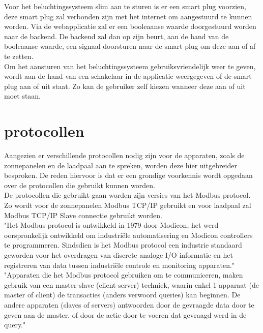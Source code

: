 Voor het beluchtingssysteem slim aan te sturen is er een smart plug voorzien, deze smart plug zal verbonden zijn met het internet om aangestuurd te kunnen worden. Via de webapplicatie zal er een booleaanse waarde doorgestuurd worden naar de backend. De backend zal dan op zijn beurt, aan de hand van de booleaanse waarde, een signaal doorsturen naar de smart plug om deze aan of af te zetten.\\

Om het aansturen van het beluchtingssysteem gebruiksvriendelijk weer te geven, wordt aan de hand van een schakelaar in de applicatie weergegeven of de smart plug aan of uit staat. Zo kan de gebruiker zelf kiezen wanneer deze aan of uit moet staan.

\section{protocollen}
\label{sec:stand-van-zaken-protocollen}

Aangezien er verschillende protocollen nodig zijn voor de apparaten, zoals de zonnepanelen en de laadpaal aan te spreken, worden deze hier uitgebreider besproken. De reden hiervoor is dat er een grondige voorkennis wordt opgedaan over de protocollen die gebruikt kunnen worden.\\

De protocollen die gebruikt gaan worden zijn versies van het Modbus protocol. Zo wordt voor de zonnepanelen Modbus TCP/IP gebruikt en voor laadpaal zal Modbus TCP/IP Slave connectie gebruikt worden.\\

"Het Modbus protocol is ontwikkeld in 1979 door Modicon, het werd oorspronkelijk ontwikkeld om industriële automatisering en Modicon controllers te programmeren. Sindsdien is het Modbus protocol een industrie standaard geworden voor het overdragen van discrete analoge I/O informatie en het registreren van data tussen industriële controle en monitoring apparaten." \autocite{Acromag2005} \\

"Apparaten die het Modbus protocol gebruiken om te communiceren, maken gebruik van een master-slave (client-server) techniek, waarin enkel 1 apparaat (de master of client) de transacties (anders verwoord queries) kan beginnen. De andere apparaten (slaves of servers) antwoorden door de gevraagde data door te geven aan de master, of door de actie door te voeren dat gevraagd werd in de query." \autocite{Acromag2005} \\

